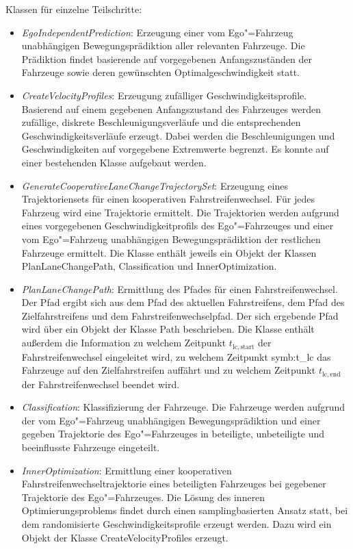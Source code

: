 Klassen f\"ur einzelne Teilschritte:
\begin{itemize}
\item \textit{EgoIndependentPrediction}: Erzeugung einer vom Ego"=Fahrzeug unabh\"angigen Bewegungspr\"adiktion aller relevanten Fahrzeuge.
Die Pr\"adiktion findet basierende auf vorgegebenen Anfangszust\"anden der Fahrzeuge sowie deren gew\"unschten Optimalgeschwindigkeit statt.


\item \textit{CreateVelocityProfiles}: Erzeugung zuf\"alliger Geschwindigkeitsprofile. 
Basierend auf einem gegebenen Anfangszustand des Fahrzeuges werden zuf\"allige, diskrete Beschleunigungsverl\"aufe und die entsprechenden Geschwindigkeitsverl\"aufe erzeugt.
Dabei werden die Beschleunigungen und Geschwindigkeiten auf vorgegebene Extremwerte begrenzt.
Es konnte auf einer bestehenden Klasse aufgebaut werden.
 
\item \textit{GenerateCooperativeLaneChangeTrajectorySet}: Erzeugung eines Trajektoriensets f\"ur einen kooperativen Fahrstreifenwechsel.
F\"ur jedes Fahrzeug wird eine Trajektorie ermittelt.
Die Trajektorien werden aufgrund eines vorgegebenen Geschwindigkeitprofils des Ego"=Fahrzeuges und einer vom Ego"=Fahrzeug unabh\"angigen Bewegungspr\"adiktion der restlichen Fahrzeuge ermittelt.
Die Klasse enth\"alt jeweils ein Objekt der Klassen PlanLaneChangePath, Classification und InnerOptimization.

\item \textit{PlanLaneChangePath}: Ermittlung des Pfades f\"ur einen Fahrstreifenwechsel.
Der Pfad ergibt sich aus dem Pfad des aktuellen Fahrstreifens, dem Pfad des Zielfahrstreifens und dem Fahrstreifenwechselpfad.
Der sich ergebende Pfad wird \"uber ein Objekt der Klasse Path beschrieben.
Die Klasse enth\"alt au{\ss}erdem die Information zu welchem Zeitpunkt \(t_\mathrm{lc, start}\) der Fahrstreifenwechsel eingeleitet wird, zu welchem Zeitpunkt \gls{symb:t_lc} das Fahrzeuge auf den Zielfahrstreifen auff\"ahrt und zu welchem Zeitpunkt \(t_\mathrm{lc, end}\) der Fahrstreifenwechsel beendet wird.

\item \textit{Classification}: Klassifizierung der Fahrzeuge. 
Die Fahrzeuge werden aufgrund der vom Ego"=Fahrzeug unabh\"angigen Bewegungspr\"adiktion und einer gegeben Trajektorie des Ego"=Fahrzeuges in beteiligte, unbeteiligte und beeinflusste Fahrzeuge eingeteilt.

\item \textit{InnerOptimization}: Ermittlung einer kooperativen Fahrstreifenwechseltrajektorie eines beteiligten Fahrzeuges bei gegebener Trajektorie des Ego"=Fahrzeuges. 
Die L\"osung des inneren Optimierungsproblems findet durch einen samplingbasierten Ansatz statt, bei dem randomisierte Geschwindigkeitsprofile erzeugt werden.
Dazu wird ein Objekt der Klasse CreateVelocityProfiles erzeugt.


\end{itemize}

